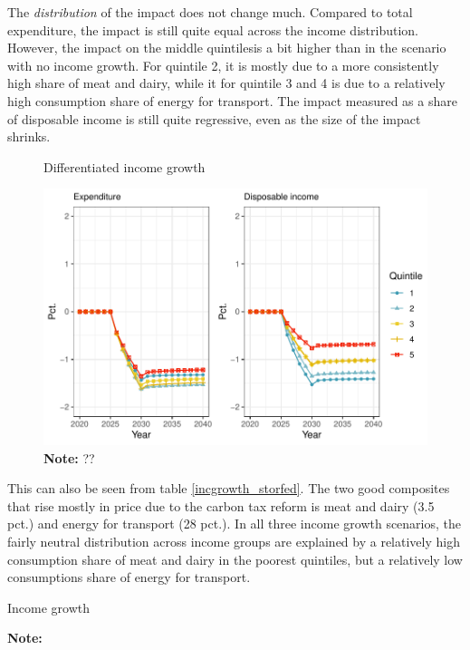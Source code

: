 The \textit{distribution} of the impact does not change much. Compared to total expenditure, the impact is still quite equal across the income distribution. However, the impact on the middle quintilesis a bit higher than in the scenario with no income growth. For quintile 2, it is mostly due to a more consistently high share of meat and dairy, while it for quintile 3 and 4 is due to a relatively high consumption share of energy for transport. The impact measured as a share of disposable income is still quite regressive, even as the size of the impact shrinks.

\begin{figure}[H]
\centering
\caption{Differentiated income growth}
\label{fig:diffincgro}
\includegraphics[width=.7\textwidth]{Figures/timeEV_1250_indfas_diffincgrowth.pdf}
\captionsetup{singlelinecheck=off,size=scriptsize}
\setlength{\captionmargin}{10pt}
\caption*{
\textbf{Note:} ??\\}
\end{figure}

This can also be seen from table \ref{incgrowth_storfed}. The two good composites that rise mostly in price due to the carbon tax reform is meat and dairy (3.5 pct.) and energy for transport (28 pct.). In all three income growth scenarios, the fairly neutral distribution across income groups are explained by a relatively high consumption share of meat and dairy in the poorest quintiles, but a relatively low consumptions share of energy for transport. 

\begin{table}[H]
    \centering
    \caption{Income growth}
    \label{incgrowth_storfed}
    \resizebox{\textwidth}{!}{%
    
    }
    \captionsetup{singlelinecheck=off,size=scriptsize}
\setlength{\captionmargin}{10pt}
\caption*{
\textbf{Note:} }
\end{table}

